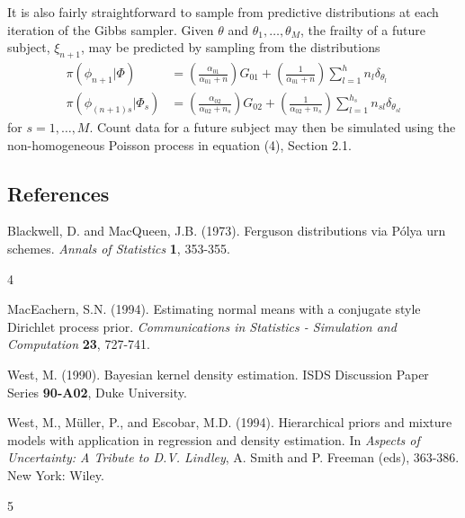 \documentclass[10pt, letterpaper]{article}
\begin{document}
It is also fairly straightforward to sample from predictive distributions at each iteration of the Gibbs sampler. Given $\theta$ and $\theta_1, \dots, \theta_M$, the frailty of a future subject, $\xi_{n+1}$, may be predicted by sampling from the distributions
\begin{align} 
\pi(\phi_{n+1} | \Phi) &= \left( \frac{\alpha_{01}}{\alpha_{01} + n} \right) G_{01} + \left( \frac{1}{\alpha_{01} + n} \right) \sum_{l=1}^h n_l \delta_{\theta_l} \label{eq:A13} \tag{A-13} \\
\pi(\phi_{(n+1)s} | \Phi_s) &= \left( \frac{\alpha_{02}}{\alpha_{02} + n_s} \right) G_{02} + \left( \frac{1}{\alpha_{02} + n_s} \right) \sum_{l=1}^{h_s} n_{sl} \delta_{\theta_{sl}} \label{eq:A14} \tag{A-14} 
\end{align}
for $s=1, \dots, M$. Count data for a future subject may then be simulated using the non-homogeneous Poisson process in equation (4), Section 2.1.

\subsection*{References}

Blackwell, D. and MacQueen, J.B. (1973). Ferguson distributions via P\'{o}lya urn schemes. \textit{Annals of Statistics} \textbf{1}, 353-355.

\vfill
\centerline{4}
\clearpage %

MacEachern, S.N. (1994). Estimating normal means with a conjugate style Dirichlet process prior. \textit{Communications in Statistics - Simulation and Computation} \textbf{23}, 727-741.

West, M. (1990). Bayesian kernel density estimation. ISDS Discussion Paper Series \textbf{90-A02}, Duke University.

West, M., M\"{u}ller, P., and Escobar, M.D. (1994). Hierarchical priors and mixture models with application in regression and density estimation. In \textit{Aspects of Uncertainty: A Tribute to D.V. Lindley}, A. Smith and P. Freeman (eds), 363-386. New York: Wiley.

\vfill
\centerline{5}
\clearpage %
\end{document}
